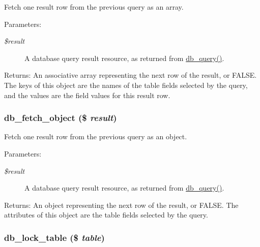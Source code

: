 Fetch one result row from the previous query as an array.

\begin{Desc}
\item[Parameters:]
\begin{description}
\item[{\em \$result}]A database query result resource, as returned from \hyperlink{database_8mysql-common_8inc_9e096321b86945d128746ac7bedce8f3}{db\_\-query()}. \end{description}
\end{Desc}
\begin{Desc}
\item[Returns:]An associative array representing the next row of the result, or FALSE. The keys of this object are the names of the table fields selected by the query, and the values are the field values for this result row. \end{Desc}
\hypertarget{database_8mysqli_8inc_5faaeba7105d28828db453b4fd3c75d4}{
\subsubsection[{db\_\-fetch\_\-object}]{\setlength{\rightskip}{0pt plus 5cm}db\_\-fetch\_\-object (\$ {\em result})}}
\label{database_8mysqli_8inc_5faaeba7105d28828db453b4fd3c75d4}


Fetch one result row from the previous query as an object.

\begin{Desc}
\item[Parameters:]
\begin{description}
\item[{\em \$result}]A database query result resource, as returned from \hyperlink{database_8mysql-common_8inc_9e096321b86945d128746ac7bedce8f3}{db\_\-query()}. \end{description}
\end{Desc}
\begin{Desc}
\item[Returns:]An object representing the next row of the result, or FALSE. The attributes of this object are the table fields selected by the query. \end{Desc}
\hypertarget{database_8mysqli_8inc_8584042b05393a82b7d06c2ee6cf95ed}{
\subsubsection[{db\_\-lock\_\-table}]{\setlength{\rightskip}{0pt plus 5cm}db\_\-lock\_\-table (\$ {\em table})}}
\label{database_8mysqli_8inc_8584042b05393a82b7d06c2ee6cf95ed}


